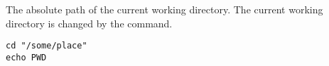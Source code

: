 %

The absolute path of the current working directory.
The current working directory is changed by the  command.

\begin{lstlisting}[style=Groovybash, label={lst:example_variable_pwd}]
cd "/some/place"
echo PWD
\end{lstlisting}

